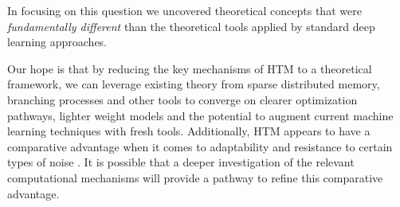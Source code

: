 \documentclass{article}
\begin{document}
In focusing on this question we uncovered theoretical concepts that were \textit{fundamentally different} than the theoretical tools applied by standard deep learning approaches.

Our hope is that by reducing the key mechanisms of HTM to a theoretical framework, we can leverage existing theory from sparse distributed memory, branching processes and other tools to converge on clearer optimization pathways, lighter weight models and the potential to augment current machine learning techniques with fresh tools. Additionally,  HTM appears to have a comparative advantage when it comes to adaptability and resistance to certain types of noise \cite{Cui2016b, Cui2017, Cui2016}. It is possible that a deeper investigation of the relevant computational mechanisms will provide a pathway to refine this comparative advantage.



\end{document}
